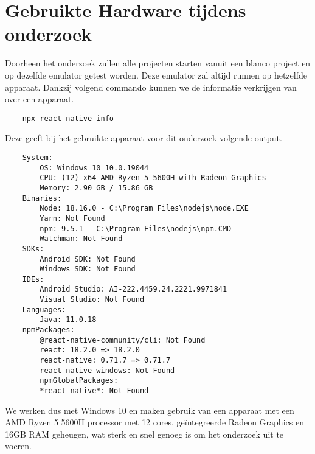 \section{Gebruikte Hardware tijdens onderzoek}
Doorheen het onderzoek zullen alle projecten starten vanuit een blanco project en op dezelfde emulator 
getest worden. Deze emulator zal altijd runnen op hetzelfde apparaat. Dankzij volgend commando 
kunnen we de informatie verkrijgen van over een apparaat.
\begin{verbatim}
    npx react-native info
\end{verbatim}
Deze geeft bij het gebruikte apparaat voor dit onderzoek volgende output.
\begin{verbatim}
    System:
        OS: Windows 10 10.0.19044
        CPU: (12) x64 AMD Ryzen 5 5600H with Radeon Graphics
        Memory: 2.90 GB / 15.86 GB
    Binaries:
        Node: 18.16.0 - C:\Program Files\nodejs\node.EXE
        Yarn: Not Found
        npm: 9.5.1 - C:\Program Files\nodejs\npm.CMD
        Watchman: Not Found
    SDKs:
        Android SDK: Not Found
        Windows SDK: Not Found
    IDEs:
        Android Studio: AI-222.4459.24.2221.9971841
        Visual Studio: Not Found
    Languages:
        Java: 11.0.18
    npmPackages:
        @react-native-community/cli: Not Found
        react: 18.2.0 => 18.2.0 
        react-native: 0.71.7 => 0.71.7 
        react-native-windows: Not Found
        npmGlobalPackages:
        *react-native*: Not Found
\end{verbatim}
We werken dus met Windows 10 en maken gebruik van een apparaat met een AMD Ryzen 5 5600H processor 
met 12 cores, geïntegreerde Radeon Graphics en 16GB RAM geheugen, wat sterk en snel 
genoeg is om het onderzoek uit te voeren.










